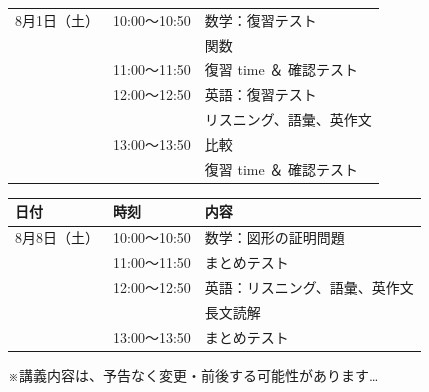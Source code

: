 \begin{tabular}{l l p{6cm}}
      \midrule
       {8月1日（土）}  & 10:00～10:50 & 数学：復習テスト \\
                      &              & \qquad\;\; 関数\\
                      & 11:00～11:50 & \qquad\;\; 復習 time ＆ 確認テスト \\
                      & 12:00～12:50 & 英語：復習テスト \\
                      &              & \qquad\;\; リスニング、語彙、英作文\\
                      & 13:00～13:50 & \qquad\;\; 比較\\
                      &              & \qquad\;\; 復習 time ＆ 確認テスト \\
      \bottomrule
    \end{tabular}

  \newpage
  \begin{tabular}{l l p{6cm}}
      \toprule
      \textbf{日付} & \textbf{時刻} & \textbf{内容} \\
      \midrule
        {8月8日（土）} & 10:00～10:50 & 数学：図形の証明問題\\
                      & 11:00～11:50 & \qquad\;\;まとめテスト\\
                      & 12:00～12:50 & 英語：リスニング、語彙、英作文\\
                      &              & \qquad\;\; 長文読解\\
                      & 13:00～13:50 & \qquad\;\; まとめテスト\\
      \bottomrule
    \end{tabular}
    \vspace{1em}

    ※講義内容は、予告なく変更・前後する可能性があります…
